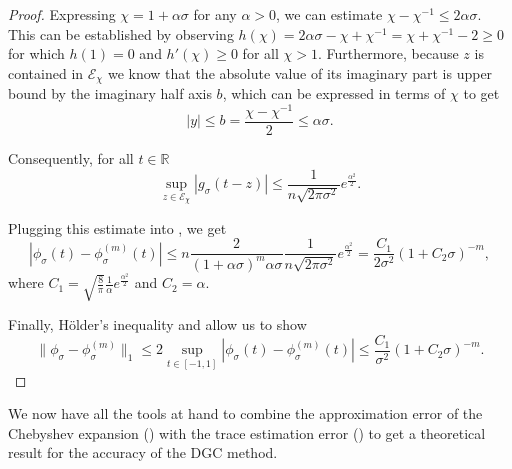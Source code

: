 \begin{proof}
    Expressing $\chi = 1 + \alpha \sigma$ for any $\alpha > 0$,
    we can estimate $\chi - \chi^{-1} \leq 2\alpha\sigma$.
    This can be established by observing
    $h(\chi) = 2\alpha\sigma - \chi + \chi^{-1} = \chi + \chi^{-1} - 2 \geq 0$
    for which $h(1) = 0$ and $h'(\chi) \geq 0$ for all $\chi > 1$.
    Furthermore, because $z$ is
    contained in $\mathcal{E}_{\chi}$ we know that the absolute value of its
    imaginary part is upper bound by the imaginary half axis $b$, which can be
    expressed in terms of $\chi$ to get
    \begin{equation}
        |y| \leq b = \frac{\chi - \chi^{-1}}{2} \leq \alpha\sigma.
    \end{equation}

    Consequently, for all $t \in \mathbb{R}$
    \begin{equation}
        \sup_{z \in \mathcal{E}_{\chi}} |g_{\sigma}(t - z)| 
        \leq \frac{1}{n \sqrt{2 \pi \sigma^2}} e^{\frac{\alpha^2}{2}}.
    \end{equation}

    Plugging this estimate into , we get
    \begin{equation}
        \left| \phi_{\sigma}(t) - \phi_{\sigma}^{(m)}(t) \right|
        \leq n \frac{2}{(1 + \alpha\sigma)^{m}\alpha \sigma} \frac{1}{n \sqrt{2 \pi \sigma^2}} e^{\frac{\alpha^2}{2}}
        = \frac{C_1}{2 \sigma^2} (1 + C_2 \sigma)^{-m},
        \label{equ:2-chebyshev-uniform-bound}
    \end{equation}
    where $C_1=\sqrt{\frac{8}{\pi}}\frac{1}{\alpha}e^{\frac{\alpha^2}{2}}$ and $C_2=\alpha$.

    Finally, Hölder's inequality \cite{klenke2013probability} and 
     allow us to show
    \begin{equation}
        \lVert \phi_{\sigma} - \phi_{\sigma}^{(m)} \rVert _1
            \leq 2 \sup_{t \in [-1, 1]} \left| \phi_{\sigma}(t) - \phi_{\sigma}^{(m)}(t) \right|
            \leq \frac{C_1}{\sigma^2} (1 + C_2 \sigma)^{-m}.
    \end{equation}
\end{proof}

We now have all the tools at hand to combine the approximation error of the
Chebyshev expansion () with the trace estimation
error () to get a theoretical
result for the accuracy of the \gls{DGC} method.

